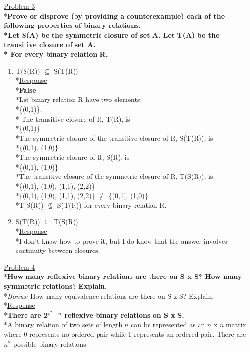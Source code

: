 \documentclass[12pt]{article}
\begin{document}
\medskip
\uline{Problem 3}
\\*\textbf{Prove or disprove (by providing a counterexample) each of the following properties of binary relations:
\\*Let S(A) be the symmetric closure of set A. Let T(A) be the transitive closure of set A.
\\* For every binary relation R,}
\begin{enumerate}
\item T(S(R)) $\subseteq$ S(T(R))
\smallskip
\\*\uline{Response}
\\*\textbf{False}
\\*Let binary relation R have two elements: 
\\*\{(0,1)\}.
\\* The transitive closure of R, T(R), is 
\\*\{(0,1)\}
\\*The symmetric closure of the transitive closure of R, S(T(R)), is 
\\*\{(0,1), (1,0)\}
\smallskip
\\*The symmetric closure of R, S(R), is
\\*\{(0,1), (1,0)\}
\\*The transitive closure of the symmetric closure of R, T(S(R)), is
\\*\{(0,1), (1,0), (1,1), (2,2)\}
\medskip
\\*\{(0,1), (1,0), (1,1), (2,2)\} $\not\subseteq$ \{(0,1), (1,0)\}
\\*T(S(R)) $\not\subseteq$ S(T(R)) for every binary relation R.

\item S(T(R)) $\subseteq$ T(S(R))
\smallskip
\\*\uline{Response}
\\*I don't know how to prove it, but I do know that the answer involves continuity between closures.
\end{enumerate}
\medskip
\uline{Problem 4}
\\*\textbf{How many reflexive binary relations are there on S x S? How many symmetric relations? Explain.}
\\*\textit{Bonus:} How many equivalence relations are there on S x S? Explain.
\smallskip
\\*\uline{Response}
\\*\textbf{There are 2$^{n^2-n}$ reflexive binary relations on S x S.}
\\*A binary relation of two sets of length $n$ can be represented as an $n$ x $n$ matrix where 0 represents no ordered pair while 1 represents an ordered pair. There are $n^2$ possible binary relations 
\end{document}
